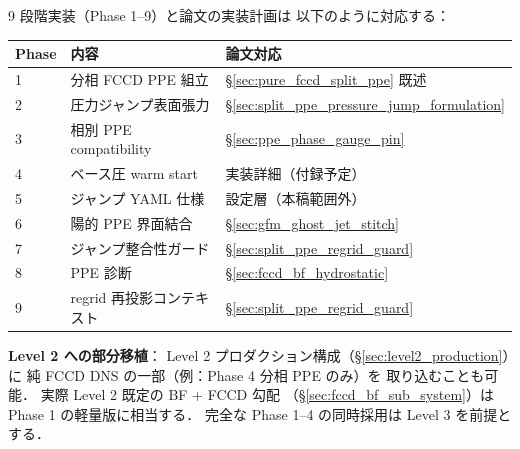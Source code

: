 9 段階実装（Phase 1--9）と論文の実装計画は
以下のように対応する：

\begin{center}
\small
\begin{tabular}{@{}lll@{}}
\hline
Phase & 内容 & 論文対応 \\
\hline
1 & 分相 FCCD PPE 組立 & §\ref{sec:pure_fccd_split_ppe} 既述 \\
2 & 圧力ジャンプ表面張力 & §\ref{sec:split_ppe_pressure_jump_formulation} \\
3 & 相別 PPE compatibility & §\ref{sec:ppe_phase_gauge_pin} \\
4 & ベース圧 warm start & 実装詳細（付録予定） \\
5 & ジャンプ YAML 仕様 & 設定層（本稿範囲外） \\
6 & 陽的 PPE 界面結合 & §\ref{sec:gfm_ghost_jet_stitch} \\
7 & ジャンプ整合性ガード & §\ref{sec:split_ppe_regrid_guard} \\
8 & PPE 診断 & §\ref{sec:fccd_bf_hydrostatic} \\
9 & regrid 再投影コンテキスト & §\ref{sec:split_ppe_regrid_guard} \\
\hline
\end{tabular}
\end{center}

\noindent\textbf{Level 2 への部分移植}：
Level 2 プロダクション構成（§\ref{sec:level2_production}）に
純 FCCD DNS の一部（例：Phase 4 分相 PPE のみ）を
取り込むことも可能．
実際 Level 2 既定の BF + FCCD 勾配
（§\ref{sec:fccd_bf_sub_system}）は
Phase 1 の軽量版に相当する．
完全な Phase 1--4 の同時採用は Level 3 を前提とする．

